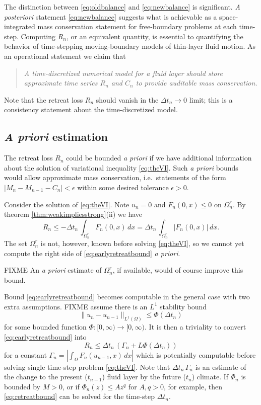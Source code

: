 \documentclass[final,onefignum]{siamart190516}
\newcommand\eps{\epsilon}
\begin{document}
The distinction between \eqref{eq:oldbalance} and \eqref{eq:newbalance} is significant.  \emph{A posteriori} statement \eqref{eq:newbalance} suggests what is achievable as a space-integrated mass conservation statement for free-boundary problems at each time-step.  Computing $R_n$, or an equivalent quantity, is essential to quantifying the behavior of time-stepping moving-boundary models of thin-layer fluid motion.  As an operational statement we claim that
\begin{quote}
\emph{A time-discretized numerical model for a fluid layer should store approximate time series $R_n$ and $C_n$ to provide auditable mass conservation.}
\end{quote}
Note that the retreat loss $R_n$ should vanish in the $\Delta t_n\to 0$ limit; this is a consistency statement about the time-discretized model.

\subsection{\emph{A priori} estimation} \label{subsec:apriori}   The retreat loss $R_n$ could be bounded \emph{a priori} if we have additional information about the solution of variational inequality \eqref{eq:theVI}.  Such \emph{a priori} bounds would allow approximate mass conservation, i.e.~statements of the form $|M_n - M_{n-1} - C_n|<\eps$ within some desired tolerance $\eps>0$.

Consider the solution of \eqref{eq:theVI}.  Note $u_n=0$ and $F_n(0,x)\le 0$ on $\Omega_n^r$.  By theorem \ref{thm:weakimpliesstrong}(ii) we have
\begin{equation}
R_n \le - \Delta t_n\,\int_{\Omega_n^r} F_n(0,x)\,dx = \Delta t_n\,\int_{\Omega_n^r} |F_n(0,x)|\,dx.  \label{eq:earlyretreatbound}
\end{equation}
The set $\Omega_n^r$ is not, however, known before solving \eqref{eq:theVI}, so we cannot yet compute the right side of \eqref{eq:earlyretreatbound} \emph{a priori}.

FIXME  An \emph{a priori} estimate of $\Omega_n^r$, if available, would of course improve this bound.

Bound \eqref{eq:earlyretreatbound} becomes computable in the general case with two extra assumptions.  FIXME assume there is an $L^1$ stability bound
\begin{equation}
\|u_n-u_{n-1}\|_{L^1(\Omega)} \le \Phi(\Delta t_n)
\end{equation}
for some bounded function $\Phi : [0,\infty) \to [0,\infty)$.  It is then a triviality to convert \eqref{eq:earlyretreatbound} into
\begin{equation}
R_n \le \Delta t_n\,\left(\Gamma_n + L \Phi(\Delta t_n)\right)   \label{eq:retreatbound}
\end{equation}
for a constant $\Gamma_n=\left|\int_{\Omega} F_n(u_{n-1},x)\,dx\right|$ which is potentially computable before solving single time-step problem \eqref{eq:theVI}.  Note that $\Delta t_n\,\Gamma_n$ is an estimate of the change to the present ($t_{n-1}$) fluid layer by the future ($t_n$) climate.  If $\Phi_n$ is bounded by $M>0$, or if $\Phi_n(z) \le A z^q$ for $A,q>0$, for example, then \eqref{eq:retreatbound} can be solved for the time-step $\Delta t_n$.
\end{document}
